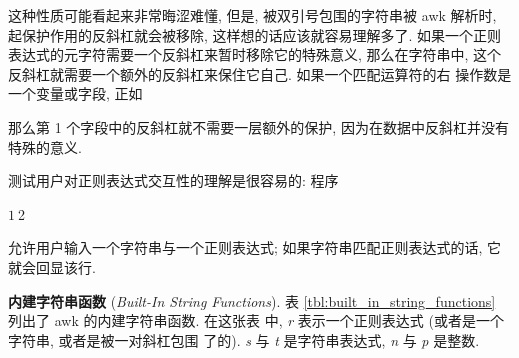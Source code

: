 这种性质可能看起来非常晦涩难懂, 但是, 被双引号包围的字符串被 awk 解析时,
起保护作用的反斜杠就会被移除, 这样想的话应该就容易理解多了. 如果一个正则
表达式的元字符需要一个反斜杠来暂时移除它的特殊意义, 那么在字符串中,
这个反斜杠就需要一个额外的反斜杠来保住它自己. 如果一个匹配运算符的右
操作数是一个变量或字段, 正如
那么第 1 个字段中的反斜杠就不需要一层额外的保护, 因为在数据中反斜杠并没有
特殊的意义.

测试用户对正则表达式交互性的理解是很容易的: 程序
\begin{awkcode}
    $1 ~ $2
\end{awkcode}
允许用户输入一个字符串与一个正则表达式; 如果字符串匹配正则表达式的话, 它
就会回显该行.

\textbf{内建字符串函数} (\emph{Built-In String Functions}). 表
\ref{tbl:built_in_string_functions} 列出了 awk 的内建字符串函数. 在这张表
中, \textit{r} 表示一个正则表达式 (或者是一个字符串, 或者是被一对斜杠包围
了的). \textit{s} 与 \textit{t} 是字符串表达式, \textit{n} 与 \textit{p}
是整数.
